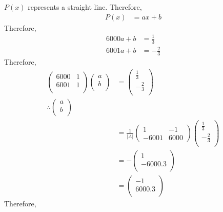 \documentclass[fleqn, a4paper, 12pt, twoside, titlepage]{article}
\theoremstyle{definition}
\theoremstyle{theorem}
\begin{document}
\begin{solution}
	$P(x)$ represents a straight line.
	Therefore,
	\begin{align*}
		P(x) &= a x + b
	\end{align*}
	Therefore,
	\begin{align*}
		6000 a + b &= \frac{1}{3}\\
		6001 a + b &= -\frac{2}{3}
	\end{align*}
	Therefore,
	\begin{align*}
			\begin{pmatrix}
				6000 & 1\\
				6001 & 1\\
			\end{pmatrix}
			\begin{pmatrix}
				a\\
				b\\
			\end{pmatrix}
		&=
			\begin{pmatrix}
				\frac{1}{3}\\
				-\frac{2}{3}\\
			\end{pmatrix}\\
		\therefore
			\begin{pmatrix}
				a\\
				b\\
			\end{pmatrix}\\
		&=
			\frac{1}{|A|}
			\begin{pmatrix}
				1 & -1\\
				-6001 & 6000
			\end{pmatrix}
			\begin{pmatrix}
				\frac{1}{3}\\
				-\frac{2}{3}\\
			\end{pmatrix}\\
		&=
			-
			\begin{pmatrix}
				1\\
				-6000.3\\
			\end{pmatrix}\\
		&=
			\begin{pmatrix}
				-1\\
				6000.3\\
			\end{pmatrix}
	\end{align*}
	Therefore,
	\begin{align*}

\end{align*}
\end{solution}
\end{document}

